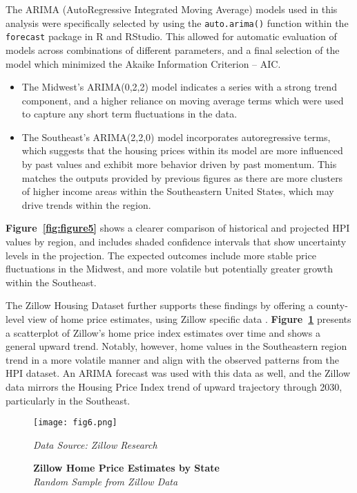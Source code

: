 \documentclass[journal,article,submit,pdftex,moreauthors]{Definitions/mdpi}
\begin{document}
The ARIMA (AutoRegressive Integrated Moving Average) models used in this analysis were specifically selected by using the \texttt{auto.arima()} function within the \texttt{forecast} package in R and RStudio. This allowed for automatic evaluation of models across combinations of different parameters, and a final selection of the model which minimized the Akaike Information Criterion -- AIC.  
\begin{itemize}
    \item The Midwest’s ARIMA(0,2,2) model indicates a series with a strong trend component, and a higher reliance on moving average terms which were used to capture any short term fluctuations in the data.
    \item The Southeast’s ARIMA(2,2,0) model incorporates autoregressive terms, which suggests that the housing prices within its model are more influenced by past values and exhibit more behavior driven by past momentum. This matches the outputs provided by previous figures as there are more clusters of higher income areas within the Southeastern United States, which may drive trends within the region.
\end{itemize}

\textbf{Figure~\ref{fig:figure5}} shows a clearer comparison of historical and projected HPI values by region, and includes shaded confidence intervals that show uncertainty levels in the projection. The expected outcomes include more stable price fluctuations in the Midwest, and more volatile but potentially greater growth within the Southeast.

The Zillow Housing Dataset further supports these findings by offering a county-level view of home price estimates, using Zillow specific data \citep{zillow_2024_housing}. \textbf{Figure~\ref{fig:figure6}} presents a scatterplot of Zillow’s home price index estimates over time and shows a general upward trend. Notably, however, home values in the Southeastern region trend in a more volatile manner and align with the observed patterns from the HPI dataset. An ARIMA forecast was used with this data as well, and the Zillow data mirrors the Housing Price Index trend of upward trajectory through 2030, particularly in the Southeast.

\begin{figure}[H]
  \centering
  \texttt{[image: fig6.png]}
  \caption{\textbf{Zillow Home Price Estimates by State}\\\textit{Random Sample from Zillow Data}}
  \label{fig:figure6}
  \vspace{1ex}
  {\footnotesize\textit{Data Source: Zillow Research}}
\end{figure}
\end{document}
